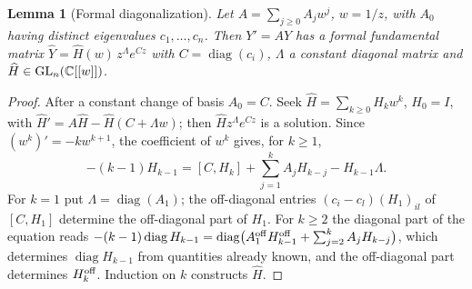 \documentclass[11pt]{article}
\numberwithin{equation}{section}
\newtheorem{lemma}[theorem]{Lemma}
\theoremstyle{definition}
\theoremstyle{remark}
\newcommand{\C}{\mathbb C}\newcommand{\Q}{\mathbb Q}\newcommand{\R}{\mathbb R}\newcommand{\Z}{\mathbb Z}
\begin{document}
\begin{lemma}[Formal diagonalization]\label{lem:formal}
Let $A=\sum_{j\ge0}A_jw^j$, $w=1/z$, with $A_0$ having distinct eigenvalues
$c_1,\dots,c_n$. Then $Y'=AY$ has a formal fundamental matrix
$\widehat Y=\widehat H(w)\,z^{\Lambda}e^{Cz}$ with $C=\operatorname{diag}(c_i)$,
$\Lambda$ a constant diagonal matrix and $\widehat H\in\GL_n(\C[[w]])$.
\end{lemma}
\begin{proof}
After a constant change of basis $A_0=C$. Seek $\widehat H=\sum_{k\ge0}H_kw^k$,
$H_0=I$, with $\widehat H'=A\widehat H-\widehat H(C+\Lambda w)$; then
$\widehat Hz^\Lambda e^{Cz}$ is a solution. Since $(w^k)'=-kw^{k+1}$, the
coefficient of $w^k$ gives, for $k\ge1$,
\[
 -(k-1)H_{k-1}=[C,H_k]+\sum_{j=1}^kA_jH_{k-j}-H_{k-1}\Lambda .
\]
For $k=1$ put $\Lambda=\operatorname{diag}(A_1)$; the off-diagonal entries
$(c_i-c_l)(H_1)_{il}$ of $[C,H_1]$ determine the off-diagonal part of $H_1$.
For $k\ge2$ the diagonal part of the equation reads
$-(k-1)\operatorname{diag}H_{k-1}=\operatorname{diag}\bigl(A_1^{\rm off}H_{k-1}^{\rm off}
+\sum_{j=2}^kA_jH_{k-j}\bigr)$, which determines $\operatorname{diag}H_{k-1}$ from
quantities already known, and the off-diagonal part determines
$H_k^{\rm off}$. Induction on $k$ constructs $\widehat H$.
\end{proof}
\end{document}
